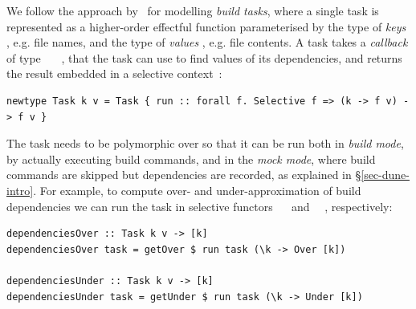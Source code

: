 We follow the approach by~\citet{mokhov2018build} for modelling \emph{build
tasks}, where a single task is represented as a higher-order effectful function
parameterised by the type of \emph{keys} , e.g. file names, and the type
of \emph{values} , e.g. file contents. A task takes a \emph{callback} of
type ~\hs{->}~~, that the task can use to find values of its
dependencies, and returns the result embedded in a selective context~:

\vspace{0.5mm}
\begin{verbatim}
newtype Task k v = Task { run :: forall f. Selective f => (k -> f v) -> f v }
\end{verbatim}
\vspace{0.5mm}

\noindent
The task needs to be polymorphic over  so that it can be run both in
\emph{build mode}, by actually executing build commands, and in the \emph{mock
mode}, where build commands are skipped but dependencies are recorded, as
explained in \S\ref{sec-dune-intro}. For example, to compute over- and
under-approximation of build dependencies we can run the task in selective
functors ~\hs{=}~ and ~\hs{=}~, respectively:

\vspace{0.5mm}
\begin{verbatim}
dependenciesOver :: Task k v -> [k]
dependenciesOver task = getOver $ run task (\k -> Over [k])

dependenciesUnder :: Task k v -> [k]
dependenciesUnder task = getUnder $ run task (\k -> Under [k])
\end{verbatim}
\vspace{0.5mm}

